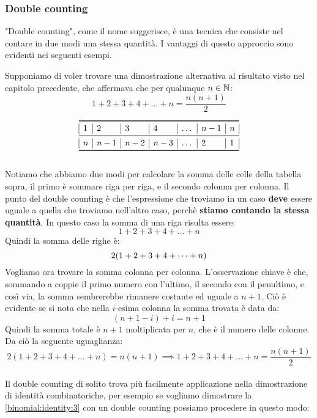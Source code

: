 \documentclass[11pt]{scrartcl}
\begin{document}
	\subsubsection{Double counting}
	"Double counting", come il nome suggerisce, è una tecnica che consiste nel contare in due modi una stessa quantità. I vantaggi di questo approccio sono evidenti nei seguenti esempi.
	
	\begin{example}
		Supponiamo di voler trovare una dimostrazione alternativa al risultato visto nel capitolo precedente, che affermava che per qualunque $n\in\mathbb N$:
		$$1+2+3+4+\dots+n=\frac{n(n+1)}{2}$$
	\end{example}
	\[
	\begin{array}{|l|l|l|l|l|l|l|}
		\toprule
		1 & 2 & 3 & 4 & \dots & n-1 & n\\
		\midrule
		n & n-1 & n-2 & n-3 & \dots & 2 & 1 \\
		\bottomrule
	\end{array}
	\]
	\\
	Notiamo che abbiamo due modi per calcolare la somma delle celle della tabella sopra, il primo è sommare riga per riga, e il secondo colonna per colonna. Il punto del double counting è che l'espressione che troviamo in un caso \textbf{deve} essere uguale a quella che troviamo nell'altro caso, perchè \textbf{stiamo contando la stessa quantità}. In questo caso la somma di una riga risulta essere:
	$$1+2+3+4+\dots+n$$
	Quindi la somma delle righe è:
	\begin{equation}\notag
		\label{double:1}
		2(1+2+3+4+\dots+n)
	\end{equation}
	Vogliamo ora trovare la somma colonna per colonna. L'osservazione chiave è che, sommando a coppie il primo numero con l'ultimo, il secondo con il penultimo, e così via, la somma sembrerebbe rimanere costante ed uguale a $n+1$.
	Ciò è evidente se si nota che nella $i$-esima colonna la somma trovata è data da:
	$$(n+1-i)+i=n+1$$
	Quindi la somma totale è $n+1$ moltiplicata per $n$, che è il numero delle colonne.
	Da ciò la seguente uguaglianza:$$2(1+2+3+4+\dots+n)=n(n+1) \implies
	1+2+3+4+\dots+n=\frac{n(n+1)}{2}$$ 
	\\
	Il double counting di solito trova più facilmente applicazione nella dimostrazione di identità combinatoriche, per esempio se vogliamo dimostrare la \ref{binomial:identity:3} con un double counting possiamo procedere in questo modo:
\end{document}
